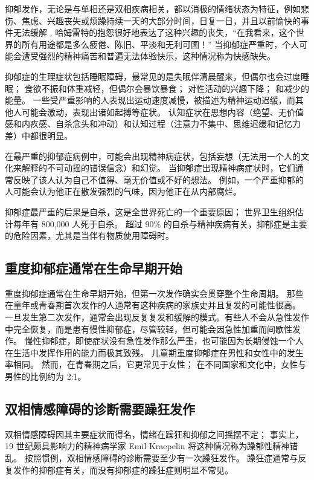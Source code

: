 抑郁发作，无论是与单相还是双相疾病相关，都以消极的情绪状态为特征，例如悲伤、焦虑、兴趣丧失或烦躁持续一天的大部分时间，日复一日，并且以前愉快的事件无法缓解 . 哈姆雷特的抱怨很好地表达了这种兴趣的丧失，“在我看来，这个世界的所有用途都是多么疲倦、陈旧、平淡和无利可图！” 当抑郁症严重时，个人可能会遭受强烈的精神痛苦和普遍无法体验快乐，这种情况称为快感缺失。

抑郁症的生理症状包括睡眠障碍，最常见的是失眠伴清晨醒来，但偶尔也会过度睡眠； 食欲不振和体重减轻，但偶尔会暴饮暴食； 对性活动的兴趣下降； 和减少的能量。 一些受严重影响的人表现出运动速度减慢，被描述为精神运动迟缓，而其他人可能会激动，表现出诸如起搏等症状。 认知症状在思想内容（绝望、无价值感和内疚感、自杀念头和冲动）和认知过程（注意力不集中、思维迟缓和记忆力差）中都很明显。

在最严重的抑郁症病例中，可能会出现精神病症状，包括妄想（无法用一个人的文化来解释的不可动摇的错误信念）和幻觉。 当抑郁症出现精神病症状时，它们通常反映了该人认为自己不值得、毫无价值或不好的想法。 例如，一个严重抑郁的人可能会认为他正在散发强烈的气味，因为他正在从内部腐烂。

抑郁症最严重的后果是自杀，这是全世界死亡的一个重要原因； 世界卫生组织估计每年有 800,000 人死于自杀。 超过 90\% 的自杀与精神疾病有关，抑郁症是主要的危险因素，尤其是当伴有物质使用障碍时。

\subsection{重度抑郁症通常在生命早期开始}
重度抑郁症通常在生命早期开始，但第一次发作确实会贯穿整个生命周期。 那些在童年或青春期首次发作的人通常有这种疾病的家族史并且复发的可能性很高。 一旦发生第二次发作，通常会出现反复复发和缓解的模式。有些人不会从急性发作中完全恢复，而是患有慢性抑郁症，尽管较轻，但可能会因急性加重而间歇性发作。 慢性抑郁症，即使症状没有急性发作那么严重，也可能因为长期侵蚀一个人在生活中发挥作用的能力而极其致残。 儿童期重度抑郁症在男性和女性中的发生率相同。 然而，在青春期之后，它更常见于女性； 在不同国家和文化中，女性与男性的比例约为 2:1。

\subsection{双相情感障碍的诊断需要躁狂发作}

双相情感障碍因其主要症状而得名，情绪在躁狂和抑郁之间摇摆不定； 事实上，19 世纪颇具影响力的精神病学家 Emil Kraepelin 将这种情况称为躁郁性精神错乱。 按照惯例，双相情感障碍的诊断需要至少有一次躁狂发作。 躁狂症通常与反复发作的抑郁症有关，而没有抑郁症的躁狂症则明显不常见。

